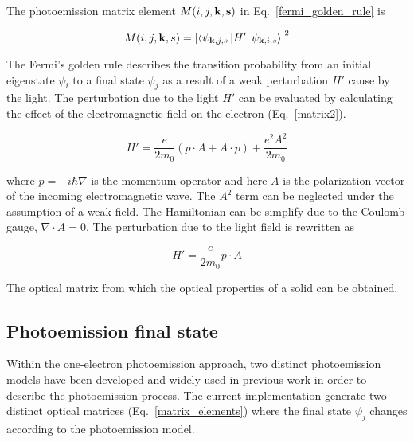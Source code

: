 \documentclass[a4paper,11pt,twoside]{book}
\begin{document}
The photoemission matrix element $M(i,j,\bf{k},s)$ in Eq.~\ref{fermi_golden_rule} is

\begin{equation}
M(i,j,{\bf{k}},s) = \left | \left \langle \psi_{{\bf{k}},j,s}\left | H'  \right | \psi_{{\bf{k}},i,s} \right \rangle \right |^2
    \label{matrix_elements}
\end{equation}

The Fermi's golden rule describes the transition probability from an initial eigenstate $\psi_i$ to a final state $\psi_j$ as a result of a weak perturbation $H'$ cause by the light. The perturbation due to the light $H'$ can be evaluated by calculating the effect of the electromagnetic field on the electron (Eq.~\ref{matrix2}).

\begin{equation}
H' = \frac{e}{2m_{0}} (p \cdot A + A \cdot p) + \frac{e^2 A^2}{2 m_0}
\label{matrix2}
\end{equation}

where $p = - i \hbar \nabla $ is the momentum operator and here $A$ is the polarization vector of the incoming electromagnetic wave. The $A^2$ term can be neglected under the assumption of a weak field. The Hamiltonian can be simplify due to the Coulomb gauge, $\nabla \cdot A = 0$. The perturbation due to the light field is rewritten as

\begin{equation}
H' = \frac{e}{2m_{0}} p \cdot A
\label{matrix3}
\end{equation}

The optical matrix from which the optical properties of a solid can be obtained.

\subsection{Photoemission final state}

Within the one-electron photoemission approach, two distinct photoemission models have been developed and widely used in previous work in order to describe the photoemission process. The current implementation generate two distinct optical matrices (Eq.~\ref{matrix_elements}) where the final state $\psi_j$ changes according to the photoemission model.
\end{document}
